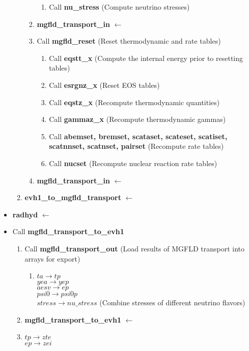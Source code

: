 \documentclass[11pt,doublespace]{article}
\begin{document}
\begin{itemize}
\begin{enumerate}
\begin{enumerate}
\begin{enumerate}
  \item Call {\bf nu\_stress} (Compute neutrino stresses)
\end{enumerate}
  \item {\bf mgfld\_transport\_in} $\leftarrow$
  \item Call {\bf mgfld\_reset} (Reset thermodynamic and rate tables)
\begin{enumerate}
  \item Call {\bf eqstt_x} (Compute the internal energy prior to resetting tables)
  \item Call {\bf esrgnz_x} (Reset EOS tables)
  \item Call {\bf eqstz_x} (Recompute thermodynamic quantities)
  \item Call {\bf gammaz_x} (Recompute thermodynamic gammas)
  \item Call {\bf abemset, bremset, scataset, scateset, scatiset, scatnnset, scatnset, pairset} (Recompute rate tables)
  \item Call {\bf nucset} (Recompute nuclear reaction rate tables)
\end{enumerate}
  \item {\bf mgfld\_transport\_in} $\leftarrow$
\end{enumerate}
  \item {\bf evh1\_to\_mgfld\_transport} $\leftarrow$
\end{enumerate}
  \item {\bf radhyd} $\leftarrow$
  \item Call {\bf mgfld\_transport\_to\_evh1}
\begin{enumerate}
  \item Call {\bf mgfld\_transport\_out} (Load results of MGFLD transport into arrays for export)
\begin{enumerate}
  \item $ta \rightarrow tp$\\
            $yea \rightarrow yep$\\
            $aesv \rightarrow ep$\\
            $psi0 \rightarrow psi0p$\\
            $stress \rightarrow nu\_stress$ (Combine stresses of different neutrino flavors)
\end{enumerate}
  \item {\bf mgfld\_transport\_to\_evh1} $\leftarrow$
  \item $tp \rightarrow zte$\\
           $ep \rightarrow zei$\\

\end{enumerate}
\end{itemize}
\end{document}
